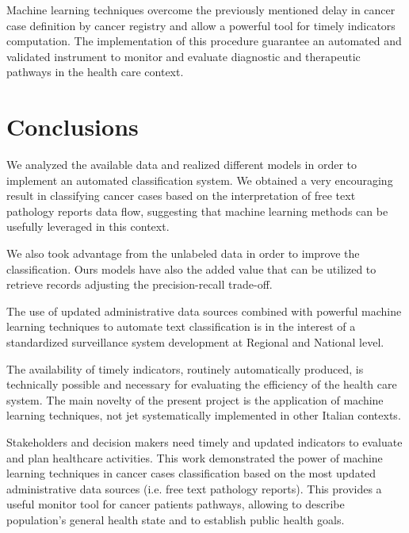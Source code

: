 Machine learning techniques overcome the previously mentioned
delay in cancer case definition by cancer registry and allow a
powerful tool for timely indicators computation. The implementation of
this procedure guarantee an automated and validated instrument to
monitor and evaluate diagnostic and therapeutic pathways in the
health care context.

\section{Conclusions}
We analyzed the available data and realized different models in order
to implement an automated classification system. We obtained a very
encouraging result in classifying cancer cases based on the
interpretation of free text pathology reports data flow, suggesting that
machine learning methods can be usefully leveraged in this context.

We also took advantage from the unlabeled data in order to improve
the classification. Ours models have also the added value that can be
utilized to retrieve records adjusting the precision-recall trade-off.

The use of updated administrative data sources combined with powerful
machine learning techniques to automate text classification is in the
interest of a standardized surveillance system development at Regional
and National level.

The availability of timely indicators, routinely automatically
produced, is technically possible and necessary for evaluating the
efficiency of the health care system. The main novelty of the present
project is the application of machine learning techniques, not jet
systematically implemented in other Italian contexts.

Stakeholders and decision makers need timely and updated indicators to
evaluate and plan healthcare activities. This work demonstrated the
power of machine learning techniques in cancer cases classification
based on the most updated administrative data sources (i.e. free text
pathology reports). This provides a useful monitor tool for cancer
patients pathways, allowing to describe population’s general health
state and to establish public health goals.

